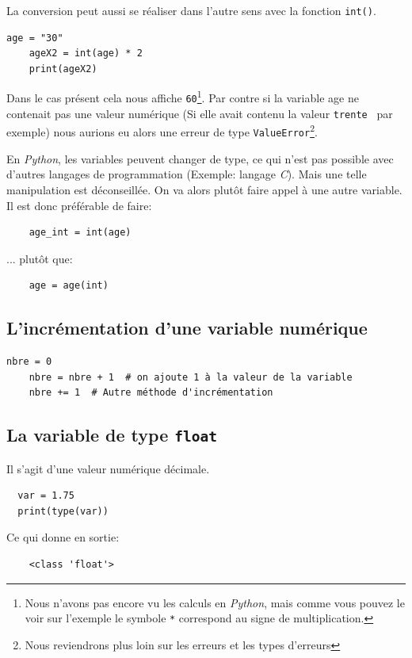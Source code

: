 \documentclass[a4paper,12pt]{book}
\begin{document}
La conversion peut aussi se réaliser dans l'autre sens avec la fonction \texttt{int()}.
\begin{lstlisting}[caption=Conversion avec la fonction \texttt{int}]
	age = "30"
	ageX2 = int(age) * 2
	print(ageX2)
\end{lstlisting}
\medskip

Dans le cas présent cela nous affiche \texttt{60}\footnote{Nous n'avons pas encore vu les calculs en \textit{Python}, mais comme vous pouvez le voir sur l'exemple le symbole \texttt{*} correspond au signe de multiplication.}. Par contre si la variable age ne contenait pas une valeur numérique (Si elle avait contenu la valeur \texttt{\og trente \fg} par exemple) nous aurions eu alors une erreur de type \texttt{ValueError}\footnote{Nous reviendrons plus loin sur les erreurs et les types d'erreurs}.
\medskip

En \textit{Python}, les variables peuvent changer de type, ce qui n'est pas possible avec d'autres langages de programmation (Exemple: langage \textit{C}). Mais une telle manipulation est déconseillée. On va alors plutôt faire appel à une autre variable. Il est donc préférable de faire:
\begin{verbatim}
    age_int = int(age)
\end{verbatim}
\medskip

... plutôt que:
\begin{verbatim}
    age = age(int)
\end{verbatim}
\medskip

\subsection*{L'incrémentation d'une variable numérique}
\begin{lstlisting}[caption=Principe de l'incrémentation]
    nbre = 0
    nbre = nbre + 1  # on ajoute 1 à la valeur de la variable
    nbre += 1  # Autre méthode d'incrémentation
\end{lstlisting}
\medskip

\subsection*{La variable de type \texttt{float}}
Il s'agit d'une valeur numérique décimale.
\begin{lstlisting}
  var = 1.75
  print(type(var))
\end{lstlisting}
\medskip

Ce qui donne en sortie:
\begin{verbatim}
    <class 'float'>
\end{verbatim}
\medskip
\end{document}
